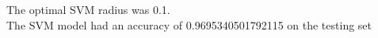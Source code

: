 \begin{answer}
The optimal SVM radius was 0.1.\\
The SVM model had an accuracy of 0.9695340501792115 on the testing set
\end{answer}
